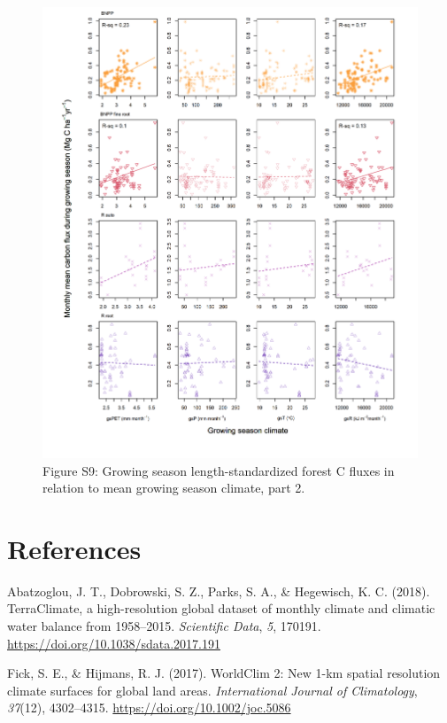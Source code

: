 \documentclass[
]{article}
\begin{document}
\newpage
\begin{figure}[H]
\includegraphics[width=1\linewidth]{tables_figures/gridded_growing_season2} \caption{Figure S9: Growing season length-standardized forest C fluxes in relation to mean growing season climate, part 2.}\label{fig:unnamed-chunk-17}
\end{figure}

\newpage

\hypertarget{references}{%
\section*{References}\label{references}}

\hypertarget{refs}{}
\leavevmode\hypertarget{ref-abatzoglou_terraclimate_2018}{}%
Abatzoglou, J. T., Dobrowski, S. Z., Parks, S. A., \& Hegewisch, K. C.
(2018). TerraClimate, a high-resolution global dataset of monthly
climate and climatic water balance from 1958--2015. \emph{Scientific
Data}, \emph{5}, 170191. \url{https://doi.org/10.1038/sdata.2017.191}

\leavevmode\hypertarget{ref-fick_worldclim_2017}{}%
Fick, S. E., \& Hijmans, R. J. (2017). WorldClim 2: New 1-km spatial
resolution climate surfaces for global land areas. \emph{International
Journal of Climatology}, \emph{37}(12), 4302--4315.
\url{https://doi.org/10.1002/joc.5086}
\end{document}
